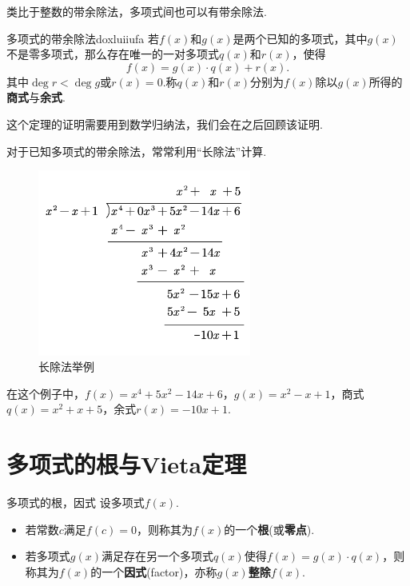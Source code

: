 \documentclass[lang=cn, zihao=5]{elegantbook}
\begin{document}
类比于整数的带余除法，多项式间也可以有带余除法.

\begin{theorem}{多项式的带余除法}{doxluiiufa}
	若$f(x)$和$g(x)$是两个已知的多项式，其中$g(x)$不是零多项式，那么存在唯一的一对多项式$q(x)$和$r(x)$，使得$$f(x) = g(x) \cdot q(x) + r(x).$$其中$\deg r < \deg g$或$r(x)=0$.称$q(x)$和$r(x)$分别为$f(x)$除以$g(x)$所得的\textbf{商式}与\textbf{余式}.
\end{theorem}
\begin{remark}
	这个定理的证明需要用到数学归纳法，我们会在之后回顾该证明.
\end{remark}

对于已知多项式的带余除法，常常利用“长除法”计算.

\begin{figure}[H]
	\centering
	\includegraphics[width=7cm]{attachment/202304151doxlui.pdf}
	\caption{长除法举例}
\end{figure}

在这个例子中，$f(x)=x^4+5x^2-14x+6$，$g(x)=x^2-x+1$，商式$q(x)=x^2+x+5$，余式$r(x)=-10x+1$.

\section{多项式的根与Vieta定理}

\begin{definition}{多项式的根，因式}
	设多项式$f(x)$.
	\begin{itemize}
		\item 若常数$c$满足$f(c)=0$，则称其为$f(x)$的一个\textbf{根}(或\textbf{零点}).
		\item 若多项式$g(x)$满足存在另一个多项式$q(x)$使得$f(x)=g(x) \cdot q(x)$，则称其为$f(x)$的一个\textbf{因式}(factor)，亦称$g(x)$\textbf{整除}$f(x)$.
	\end{itemize}
\end{definition}
\end{document}
